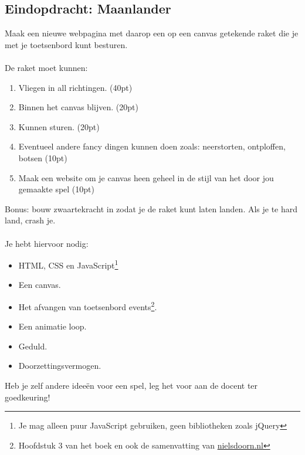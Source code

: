 \documentclass[a4paper]{report}
\begin{document}
\subsection*{Eindopdracht: Maanlander}
Maak een nieuwe webpagina met daarop een op een canvas getekende raket die je met je toetsenbord kunt besturen.
\\
\\
\noindent De raket moet kunnen:
\begin{enumerate}
	\item Vliegen in all richtingen.	(40pt)
	\item Binnen het canvas blijven. (20pt)
	\item Kunnen sturen. (20pt)
	\item Eventueel andere fancy dingen kunnen doen zoals: neerstorten, ontploffen, botsen  (10pt)
	\item Maak een website om je canvas heen geheel in de stijl van het door jou gemaakte spel (10pt)
\end{enumerate}

\noindent Bonus: bouw zwaartekracht in zodat je de raket kunt laten landen. Als je te hard land, crash je.
\\
\\
\noindent Je hebt hiervoor nodig:
\begin{itemize}
	\item HTML, CSS en JavaScript\footnote{Je mag alleen puur JavaScript gebruiken, geen bibliotheken zoals jQuery}
	\item Een canvas.
	\item Het afvangen van toetsenbord events\footnote{Hoofdstuk 3 van het boek en ook de samenvatting van \url{nielsdoorn.nl}}.
	\item Een animatie loop.
	\item Geduld.
	\item Doorzettingsvermogen.
\end{itemize}

\noindent Heb je zelf andere idee\"en voor een spel, leg het voor aan de docent ter goedkeuring!
\end{document}
